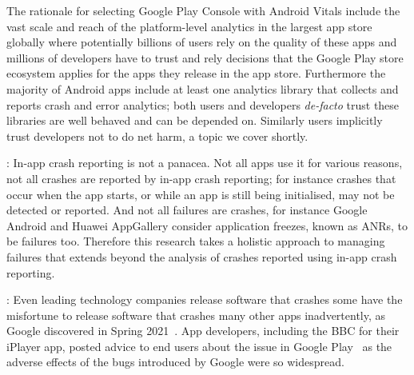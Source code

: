 
The rationale for selecting Google Play Console with Android Vitals include the vast scale and reach of the platform-level analytics in the largest app store globally where potentially billions of users rely on the quality of these apps and millions of developers have to trust and rely decisions that the Google Play store ecosystem applies for the apps they release in the app store. Furthermore the majority of Android apps include at least one analytics library that collects and reports crash and error analytics; both users and developers \emph{de-facto} trust these libraries are well behaved and can be depended on. Similarly users implicitly trust developers not to do net harm, a topic we cover shortly. %


: In-app crash reporting is not a panacea. Not all apps use it for various reasons, not all crashes are reported by in-app crash reporting; for instance crashes that occur when the app starts, or while an app is still being initialised, may not be detected or reported. And not all failures are crashes, for instance Google Android and Huawei AppGallery consider application freezes, known as ANRs, to be failures too. Therefore this research takes a holistic approach to managing failures that extends beyond the analysis of crashes reported using in-app crash reporting.   %

: Even leading technology companies release software that crashes some have the misfortune to release software that crashes many other apps inadvertently, as Google discovered in Spring 2021~. App developers, including the BBC for their iPlayer app, posted advice to end users about the issue in Google Play~ as the adverse effects of the bugs introduced by Google were so widespread.


